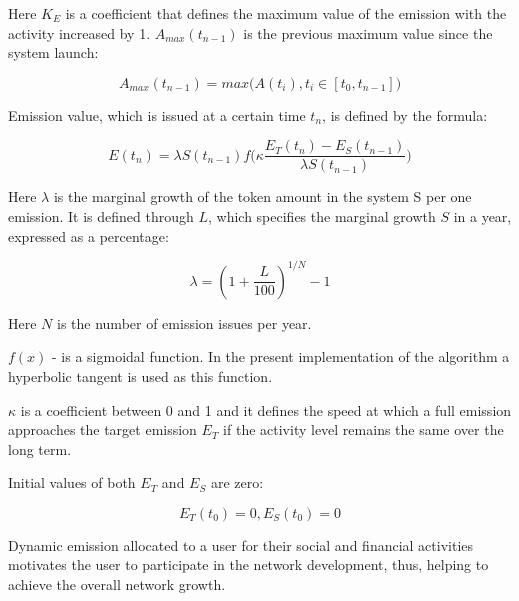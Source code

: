 \documentclass[a4paper,12pt]{article}
\begin{document}
Here $K_E$ is a coefficient that defines the maximum value of the emission with the activity increased by 1. $A_{max}(t_{n-1})$ is the previous maximum value since the system launch:



$$
    A_{max}(t_{n-1}) = max \Big ( A(t_i), t_i \in [t_0, t_{n-1}] \Big )
$$

Emission value, which is issued at a certain time $t_n$, is defined by the formula:



$$
    E(t_n) = \lambda S(t_{n-1}) f \Big( \kappa \frac {E_T(t_n) - E_S(t_{n-1})}{\lambda S(t_{n-1})} \Big)
$$

Here $\lambda$ is the marginal growth of the token amount in the system S per one emission. It is defined through $L$, which specifies the marginal growth $S$ in a year, expressed as a percentage:



$$
    \lambda = (1 + \frac{L}{100})^{1/N}-1
$$

Here $N$ is the number of emission issues per year.



$f(x)$ - is a sigmoidal function. In the present implementation of the algorithm a hyperbolic tangent is used as this function. 


$\kappa$ is a coefficient between 0 and 1 and it defines the speed at which a full emission approaches the target emission $E_T$ if the activity level remains the same over the long term.



Initial values of both $E_T$ and $E_S$ are zero:



$$
E_T(t_0)=0, E_S(t_0)=0
$$



Dynamic emission allocated to a user for their social and financial activities motivates the user to participate in the network development, thus, helping to achieve the overall network growth.

%
%
\end{document}
